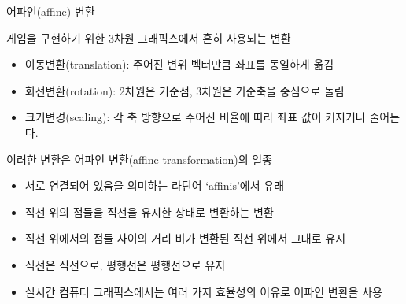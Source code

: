 \documentclass{beamer}
\begin{document}
\begin{frame}{어파인(affine) 변환}

{\small
게임을 구현하기 위한 3차원 그래픽스에서 흔히 사용되는 변환

\begin{itemize}
\item 이동변환(translation): 주어진 변위 벡터만큼 좌표를 동일하게 옮김
\item 회전변환(rotation): 2차원은 기준점, 3차원은 기준축을 중심으로 돌림
\item 크기변경(scaling): 각 축 방향으로 주어진 비율에 따라 좌표 값이 커지거나 줄어든다.
\end{itemize}

이러한 변환은 어파인 변환(affine transformation)의 일종
\begin{itemize}
\item 서로 연결되어 있음을 의미하는 라틴어 `affinis'에서 유래
\item 직선 위의 점들을 직선을 유지한 상태로 변환하는 변환
\item 직선 위에서의 점들 사이의 거리 비가 변환된 직선 위에서 그대로 유지
\item 직선은 직선으로, 평행선은 평행선으로 유지
\item 실시간 컴퓨터 그래픽스에서는 여러 가지 효율성의 이유로 어파인 변환을 사용
\end{itemize}
}

\end{frame}
\end{document}
